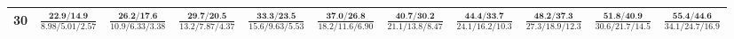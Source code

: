 \documentclass{slides}
\begin{document}
{{{\begin{tabular}{|c|c|c|c|c|c|c|c|c|c|c|}
\hline
30 & $\frac{\textbf{22.9/14.9}}{8.98/5.01/2.57}$ & $\frac{\textbf{26.2/17.6}}{10.9/6.33/3.38}$ & $\frac{\textbf{29.7/20.5}}{13.2/7.87/4.37}$ & $\frac{\textbf{33.3/23.5}}{15.6/9.63/5.53}$ & $\frac{\textbf{37.0/26.8}}{18.2/11.6/6.90}$ & $\frac{\textbf{40.7/30.2}}{21.1/13.8/8.47}$ & $\frac{\textbf{44.4/33.7}}{24.1/16.2/10.3}$ & $\frac{\textbf{48.2/37.3}}{27.3/18.9/12.3}$ & $\frac{\textbf{51.8/40.9}}{30.6/21.7/14.5}$ & $\frac{\textbf{55.4/44.6}}{34.1/24.7/16.9}$ \\
\hline
\end{tabular}}}}
\end{document}
